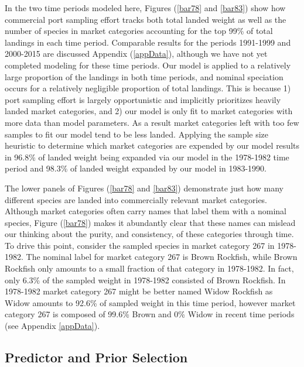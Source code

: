 \documentclass[12pt]{article}
\begin{document}
In the two time periods modeled here, Figures (\ref{bar78} and \ref{bar83}) 
show how commercial port sampling effort tracks both total landed weight as
well as the number of species in market categories accounting for the
top 99\% of total landings in each time period. Comparable results for
the periods 1991-1999 and 2000-2015 are discussed Appendix (\ref{appData}), 
although we have not yet completed modeling for these time periods. 
Our model is applied to a relatively large proportion of the landings in both 
time periods, and nominal speciation occurs for a relatively negligible 
proportion of total landings. %
This is because 1) port sampling effort is largely opportunistic and implicitly 
prioritizes heavily landed market categories, and 2) our model is only fit to 
market categories with more data than model parameters. As a result market 
categories left with too few samples to fit our model tend to be less landed. 
Applying the sample size heuristic to determine which market categories are 
expended by our model results in 96.8\% of landed weight being expanded via 
our model in the 1978-1982 time period and 98.3\% of landed weight expanded by 
our model in 1983-1990.

The lower panels of Figures (\ref{bar78} and \ref{bar83}) demonstrate just how
many different species are landed into commercially relevant market
categories. Although market categories often carry names that label them
with a nominal species, Figure (\ref{bar78}) makes it abundantly clear that
these names can mislead our thinking about the purity, and consistency,
of these categories through time. To drive this point, consider the
sampled species in market category 267 in 1978-1982. The nominal label
for market category 267 is Brown Rockfish, while Brown Rockfish only
amounts to a small fraction of that category in 1978-1982. In fact, only
6.3\% of the sampled weight in 1978-1982 consisted of Brown Rockfish. In
1978-1982 market category 267 might be better named Widow Rockfish as
Widow amounts to 92.6\% of sampled weight in this time period, however
market category 267 is composed of 99.6\% Brown and 0\% Widow in recent
time periods (see Appendix \ref{appData}).

\subsection{Predictor and Prior Selection}\label{predictor-and-prior-selection}
\end{document}
